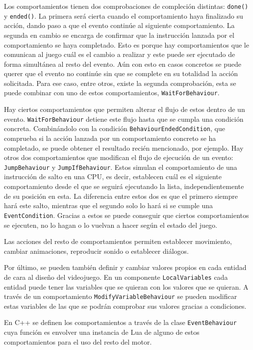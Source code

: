 \medskip

Los comportamientos tienen dos comprobaciones de compleción distintas: \texttt{done()} y \texttt{ended()}. La primera será cierta cuando el comportamiento haya finalizado su acción, dando paso a que el evento continúe al siguiente comportamiento. La segunda en cambio se encarga de confirmar que la instrucción lanzada por el comportamiento se haya completado. Esto es porque hay comportamientos que le comunican al juego cuál es el cambio a realizar y este puede ser ejecutado de forma simultánea al resto del evento. Aún con esto en casos concretos se puede querer que el evento no continúe sin que se complete en su totalidad la acción solicitada. Para ese caso, entre otros, existe la segunda comprobación, esta se puede combinar con uno de estos comportamientos, \texttt{WaitForBehaviour}.

\medskip

Hay ciertos comportamientos que permiten alterar el flujo de estos dentro de un evento. \texttt{WaitForBehaviour} detiene este flujo hasta que se cumpla una condición concreta. Combinándolo con la condición \texttt{BehaviourEndedCondition}, que comprueba si la acción lanzada por un comportamiento concreto se ha completado, se puede obtener el resultado recién mencionado, por ejemplo. Hay otros dos comportamientos que modifican el flujo de ejecución de un evento: \texttt{JumpBehaviour} y \texttt{JumpIfBehaviour}. Estos simulan el comportamiento de una instrucción de salto en una CPU, es decir, establecen cuál es el siguiente comportamiento desde el que se seguirá ejecutando la lista, independientemente de su posición en esta. La diferencia entre estos dos es que el primero siempre hará este salto, mientras que el segundo solo lo hará si se cumple una \texttt{EventCondition}. Gracias a estos se puede conseguir que ciertos comportamientos se ejecuten, no lo hagan o lo vuelvan a hacer según el estado del juego.

\smallskip

Las acciones del resto de comportamientos permiten establecer movimiento, cambiar animaciones, reproducir sonido o establecer diálogos. 

\medskip

Por último, se pueden también definir y cambiar valores propios en cada entidad de cara al diseño del videojuego. En un componente \texttt{LocalVariables} cada entidad puede tener las variables que se quieran con los valores que se quieran. A través de un comportamiento \texttt{ModifyVariableBehaviour} se pueden modificar estas variables de las que se podrán comprobar sus valores gracias a condiciones. 

\medskip

En C++ se definen los comportamientos a través de la clase \texttt{EventBehaviour} cuya función es envolver una instancia de Lua de alguno de estos comportamientos para el uso del resto del motor. 